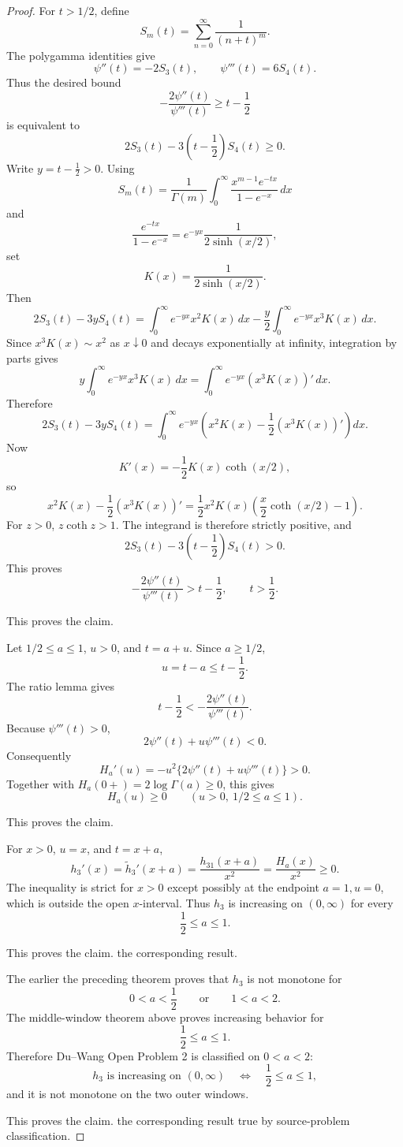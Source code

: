 \documentclass[11pt]{article}
\numberwithin{equation}{section}
\theoremstyle{definition}
\theoremstyle{remark}
\newcommand{\1}{\mathbf 1}
\begin{document}
\begin{proof}
For \(t>1/2\), define
\[
S_m(t)=\sum_{n=0}^{\infty}\frac1{(n+t)^m}.
\]
The polygamma identities give
\[
\psi''(t)=-2S_3(t),\qquad \psi'''(t)=6S_4(t).
\]
Thus the desired bound
\[
-\frac{2\psi''(t)}{\psi'''(t)}\ge t-\frac12
\]
is equivalent to
\[
2S_3(t)-3\left(t-\frac12\right)S_4(t)\ge0.
\]
Write \(y=t-\frac12>0\).  Using
\[
S_m(t)=\frac1{\Gamma(m)}
\int_0^\infty \frac{x^{m-1}e^{-tx}}{1-e^{-x}}\,dx
\]
and
\[
\frac{e^{-tx}}{1-e^{-x}}
=e^{-yx}\frac1{2\sinh(x/2)},
\]
set
\[
K(x)=\frac1{2\sinh(x/2)}.
\]
Then
\[
2S_3(t)-3yS_4(t)
=
\int_0^\infty e^{-yx}x^2K(x)\,dx
-\frac y2\int_0^\infty e^{-yx}x^3K(x)\,dx.
\]
Since \(x^3K(x)\sim x^2\) as \(x\downarrow0\) and decays exponentially at
infinity, integration by parts gives
\[
y\int_0^\infty e^{-yx}x^3K(x)\,dx
=
\int_0^\infty e^{-yx}(x^3K(x))'\,dx.
\]
Therefore
\[
2S_3(t)-3yS_4(t)
=
\int_0^\infty e^{-yx}
\left(x^2K(x)-\frac12(x^3K(x))'\right)dx.
\]
Now
\[
K'(x)=-\frac12K(x)\coth(x/2),
\]
so
\[
x^2K(x)-\frac12(x^3K(x))'
=
\frac12x^2K(x)\left(\frac x2\coth(x/2)-1\right).
\]
For \(z>0\), \(z\coth z>1\).  The integrand is therefore strictly positive,
and
\[
2S_3(t)-3\left(t-\frac12\right)S_4(t)>0.
\]
This proves
\[
-\frac{2\psi''(t)}{\psi'''(t)}>t-\frac12,
\qquad t>\frac12.
\]

This proves the claim.

Let \(1/2\le a\le1\), \(u>0\), and \(t=a+u\).  Since \(a\ge1/2\),
\[
u=t-a\le t-\frac12.
\]
The ratio lemma gives
\[
t-\frac12<-\frac{2\psi''(t)}{\psi'''(t)}.
\]
Because \(\psi'''(t)>0\),
\[
2\psi''(t)+u\psi'''(t)<0.
\]
Consequently
\[
H_a'(u)=-u^2\{2\psi''(t)+u\psi'''(t)\}>0.
\]
Together with \(H_a(0+)=2\log\Gamma(a)\ge0\), this gives
\[
H_a(u)\ge0
\qquad (u>0,\ 1/2\le a\le1).
\]

This proves the claim.

For \(x>0\), \(u=x\), and \(t=x+a\),
\[
h_3'(x)=\widetilde h_3'(x+a)=\frac{h_{31}(x+a)}{x^2}
=\frac{H_a(x)}{x^2}\ge0.
\]
The inequality is strict for \(x>0\) except possibly at the endpoint
\(a=1,u=0\), which is outside the open \(x\)-interval.  Thus \(h_3\) is
increasing on \((0,\infty)\) for every
\[
\frac12\le a\le1.
\]

This proves the claim.
the corresponding result.

The earlier the preceding theorem proves that
\(h_3\) is not monotone for
\[
0<a<\frac12
\qquad\text{or}\qquad
1<a<2.
\]
The middle-window theorem above proves increasing behavior for
\[
\frac12\le a\le1.
\]
Therefore Du--Wang Open Problem 2 is classified on \(0<a<2\):
\[
h_3 \text{ is increasing on }(0,\infty)
\quad\Longleftrightarrow\quad
\frac12\le a\le1,
\]
and it is not monotone on the two outer windows.

This proves the claim.
the corresponding result true by source-problem classification.
\end{proof}
\end{document}
